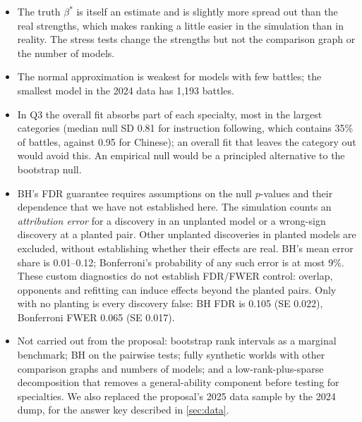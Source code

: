 \documentclass[12pt]{article}
\begin{document}
\begin{itemize}
\item The truth $\beta^*$ is itself an estimate and is slightly more spread out than the real strengths, which makes ranking a little easier in the simulation than in reality. The stress tests change the strengths but not the comparison graph or the number of models.
\item The normal approximation is weakest for models with few battles; the smallest model in the 2024 data has 1,193 battles.
\item In Q3 the overall fit absorbs part of each specialty, most in the largest categories (median null SD 0.81 for instruction following, which contains 35\% of battles, against 0.95 for Chinese); an overall fit that leaves the category out would avoid this. An empirical null \citep{efron2004large} would be a principled alternative to the bootstrap null.
\item BH's FDR guarantee requires assumptions on the null $p$-values and their dependence that we have not established here. The simulation counts an \emph{attribution error} for a discovery in an unplanted model or a wrong-sign discovery at a planted pair. Other unplanted discoveries in planted models are excluded, without establishing whether their effects are real. BH's mean error share is 0.01--0.12; Bonferroni's probability of any such error is at most 9\%. These custom diagnostics do not establish FDR/FWER control: overlap, opponents and refitting can induce effects beyond the planted pairs. Only with no planting is every discovery false: BH FDR is 0.105 (SE 0.022), Bonferroni FWER 0.065 (SE 0.017).
\item Not carried out from the proposal: bootstrap rank intervals as a marginal benchmark; BH on the pairwise tests; fully synthetic worlds with other comparison graphs and numbers of models; and a low-rank-plus-sparse decomposition that removes a general-ability component before testing for specialties. We also replaced the proposal's 2025 data sample by the 2024 dump, for the answer key described in \cref{sec:data}.
\end{itemize}

\FloatBarrier
\end{document}
